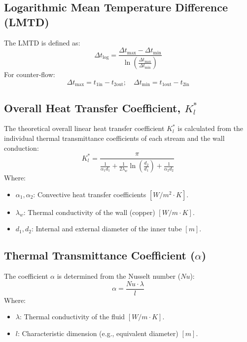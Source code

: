 \subsection{Logarithmic Mean Temperature Difference (LMTD)}\label{lmtd}

The LMTD is defined as:
\begin{equation}
    \Delta t_{\text{log}} = \frac{\Delta t_{\text{max}} - \Delta t_{\text{min}}}{\ln\left(\frac{\Delta t_{\text{max}}}{\Delta t_{\text{min}}}\right)}
\end{equation}
For counter-flow:
\begin{equation}
    \Delta t_{\text{max}} = t_{1\text{in}} - t_{2\text{out}}; \quad \Delta t_{\text{min}} = t_{1\text{out}} - t_{2\text{in}}
\end{equation}

\subsection{Overall Heat Transfer Coefficient, $K_l^*$}\label{overall-heat-transfer-coefficient}

The theoretical overall linear heat transfer coefficient $K_l^*$ is calculated from the individual thermal transmittance coefficients of each stream and the wall conduction:
\begin{equation}
    K_l^* = \frac{\pi}{\frac{1}{\alpha_1 d_1} + \frac{1}{2\lambda_w} \ln\left(\frac{d_2}{d_1}\right) + \frac{1}{\alpha_2 d_{2}}}
\end{equation}
Where:
\begin{itemize}
    \item $\alpha_1, \alpha_2$: Convective heat transfer coefficients $[W/m^2 \cdot K]$.
    \item $\lambda_w$: Thermal conductivity of the wall (copper) $[W/m \cdot K]$.
    \item $d_1, d_2$: Internal and external diameter of the inner tube $[m]$.
\end{itemize}

\subsection{Thermal Transmittance Coefficient ($\alpha$)}\label{thermal-transmittance}

The coefficient $\alpha$ is determined from the Nusselt number ($Nu$):
\begin{equation}
    \alpha = \frac{Nu \cdot \lambda}{l}
\end{equation}
Where:
\begin{itemize}
    \item $\lambda$: Thermal conductivity of the fluid $[W/m \cdot K]$.
    \item $l$: Characteristic dimension (e.g., equivalent diameter) $[m]$.
\end{itemize}

